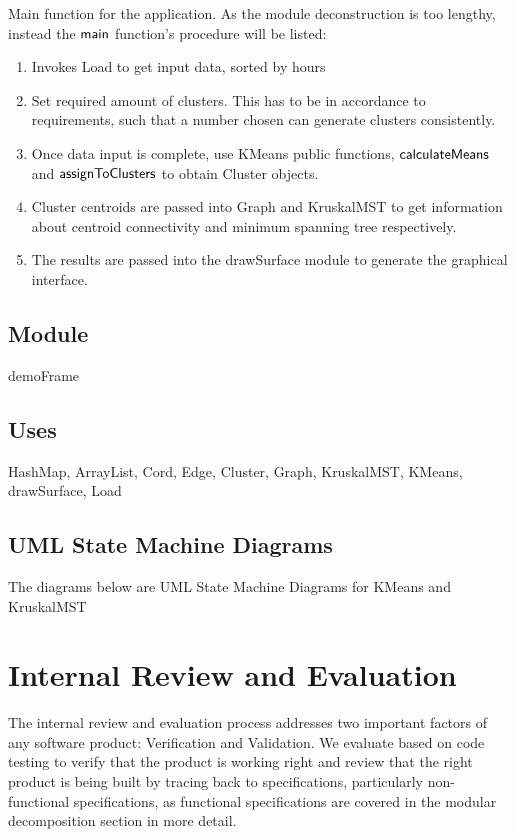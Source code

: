 \documentclass[12pt]{article}
\newcommand{\mname}[1]{\mbox{\sf #1}}
\begin{document}
Main function for the application. As the module deconstruction is too lengthy, instead
the $\mname{main}$ function's procedure will be listed:

\begin{enumerate}
\item Invokes Load to get input data, sorted by hours
\item Set required amount of clusters. This has to be in accordance to requirements, such
that a number chosen can generate clusters consistently.
\item Once data input is complete, use KMeans public functions, $\mname{calculateMeans}$ and
      $\mname{assignToClusters}$ to obtain Cluster objects. 
\item Cluster centroids are passed into Graph and KruskalMST to get information about centroid
connectivity and minimum spanning tree respectively.
\item The results are passed into the drawSurface module to generate the graphical interface.
\end{enumerate}

\subsection*{Module}

demoFrame

\subsection* {Uses}

HashMap, ArrayList, Cord, Edge, Cluster, Graph, KruskalMST, KMeans,
drawSurface, Load

\newpage

\subsection{UML State Machine Diagrams}
The diagrams below are UML State Machine Diagrams for KMeans and KruskalMST

\newpage
\section{Internal Review and Evaluation}

The internal review and evaluation process addresses two important factors of any 
software product: Verification and Validation. We evaluate based on code testing
to verify that the product is working right and review that the right product
is being built by tracing back to specifications, particularly non-functional
specifications, as functional specifications are covered in the modular
decomposition section in more detail.
\end{document}
